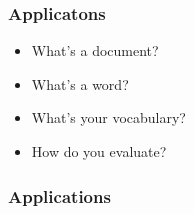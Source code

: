 

\iflong

\begin{frame}
	\frametitle{Applicatons}

	\begin{itemize}
		\item What's a document?
		\item What's a word?
		\item What's your vocabulary?
		\item How do you evaluate?
	\end{itemize}
\end{frame}
\fi

\begin{frame}
\frametitle{Applications}


\begin{block}{
}
\begin{center}

\end{center}
\end{block}
\end{frame}
